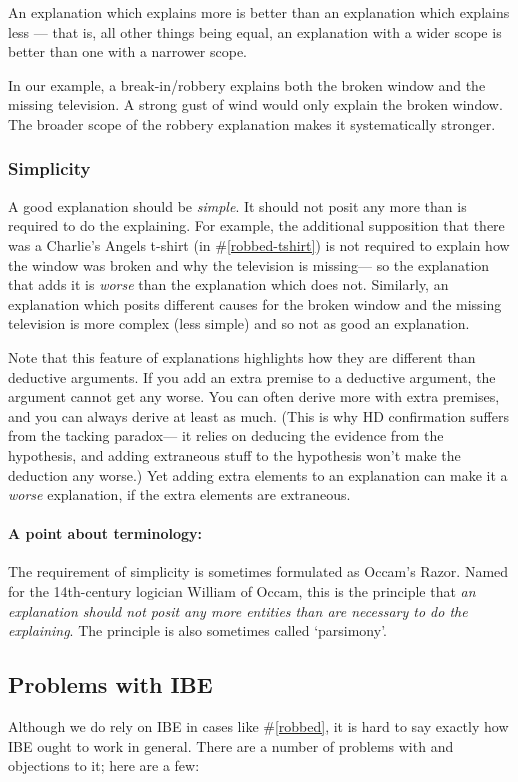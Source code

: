 \documentclass[]{article}
\newcommand*{\terminology}{\paragraph{A point about terminology:}}
\begin{document}
An explanation which explains more is better than an explanation which explains less --- that is, all other things being equal, an explanation with a wider scope is better than one with a narrower scope.

In our example, a break-in/robbery explains both the broken window and the missing television. A strong gust of wind would only explain the broken window. The broader scope of the robbery explanation makes it systematically stronger.

\subsubsection{Simplicity}

A good explanation should be \emph{simple}. It should not posit any more than is required to do the explaining. For example, the additional supposition that there was a Charlie's Angels t-shirt (in \#\ref{robbed-tshirt}) is not required to explain how the window was broken and why the television is missing--- so the explanation that adds it is \emph{worse} than the explanation which does not. Similarly, an explanation which posits different causes for the broken window and the missing television is more complex (less simple) and so not as good an explanation.

Note that this feature of explanations highlights how they are different than deductive arguments. If you add an extra premise to a deductive argument, the argument cannot get any worse. You can often derive more with extra premises, and you can always derive at least as much. (This is why HD confirmation suffers from the tacking paradox--- it relies on deducing the evidence from the hypothesis, and adding extraneous stuff to the hypothesis won't make the deduction any worse.) Yet adding extra elements to an explanation can make it a \emph{worse} explanation, if the extra elements are extraneous.

\terminology The requirement of simplicity is sometimes formulated as Occam's Razor. Named for the 14th-century logician William of Occam, this is the principle that \emph{an explanation should not posit any more entities than are necessary to do the explaining}. The principle is also sometimes called `parsimony'.


\subsection{Problems with IBE}

Although we do rely on IBE in cases like \#\ref{robbed}, it is hard to say exactly how IBE ought to work in general. There are a number of problems with and objections to it; here are a few:
\end{document}
